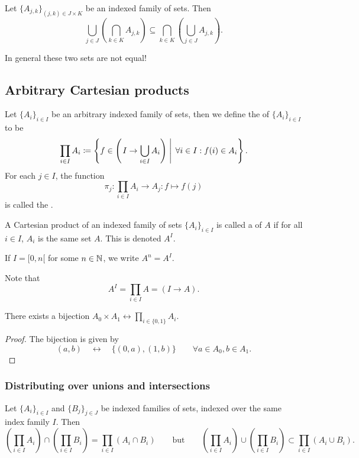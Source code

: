 \begin{lemma}
Let $\{A_{j,k}\}_{(j,k) \in J\times K}$ be an indexed family of sets. Then
\[ \bigcup_{j\in J}\left(\bigcap_{k\in K}A_{j,k}\right) \subseteq \bigcap_{k\in K}\left(\bigcup_{j\in J}A_{j,k}\right). \]
\end{lemma}
In general these two sets are not equal!


\subsection{Arbitrary Cartesian products}
\begin{definition}
Let $\{A_i\}_{i\in I}$ be an arbitrary indexed family of sets, then we define the  of $\{A_i\}_{i\in I}$ to be
\[ \prod_{i\in I}A_i \coloneqq \left\{ f\in \left(\left. I \to \bigcup_{i\in I}A_i \right) \; \right| \; \forall i\in I: f(i) \in A_i \right\}. \]
For each $j\in I$, the function
\[ \pi_j : \prod_{i\in I}A_i \to A_j: f\mapsto f(j) \]
is called the .
\end{definition}

\begin{definition}
A Cartesian product of an indexed family of sets $\{A_i\}_{i\in I}$ is called a  of $A$ if for all $i\in I$, $A_i$ is the same set $A$. This is denoted $A^I$.
\end{definition}
If $I = [0,n[$ for some $n\in \mathbb{N}$, we write $A^n = A^I$.

Note that
\[ A^I = \prod_{i\in I} A = (I\to A).  \]

\begin{lemma}
There exists a bijection $A_0\times A_1 \leftrightarrow \prod_{i\in\{0,1\}} A_i$.
\end{lemma}
\begin{proof}
The bijection is given by
\[ (a,b) \quad\leftrightarrow\quad \{(0,a),(1,b)\} \qquad \forall a\in A_0, b\in A_1. \]
\end{proof}

\subsubsection{Distributing over unions and intersections}
\begin{lemma}
Let $\{A_{i}\}_{i \in I}$ and $\{B_{j}\}_{j \in J}$ be indexed families of sets, indexed over the same index family $I$. Then
\[ \left(\prod_{i\in I}A_i\right)\cap\left(\prod_{i\in I}B_i\right) = \prod_{i\in I}(A_i\cap B_i) \qquad\text{but}\qquad \left(\prod_{i\in I}A_i\right)\cup\left(\prod_{i\in I}B_i\right) \subset \prod_{i\in I}(A_i\cup B_i). \]
\end{lemma}

